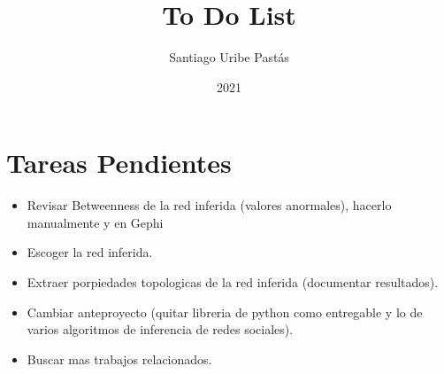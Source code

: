 \documentclass{article}
\title{To Do List}
\author{Santiago Uribe Pastás}
\date{2021}
\begin{document}
\maketitle

\section{Tareas Pendientes}
\begin{itemize}
    \item Revisar Betweenness de la red inferida (valores anormales), hacerlo manualmente y en Gephi
    \item Escoger la red inferida.
    \item Extraer porpiedades topologicas de la red inferida (documentar resultados).
    \item Cambiar anteproyecto (quitar libreria de python como entregable y lo de varios algoritmos de inferencia de redes sociales).
    \item Buscar mas trabajos relacionados.
\end{itemize}
\end{document}
